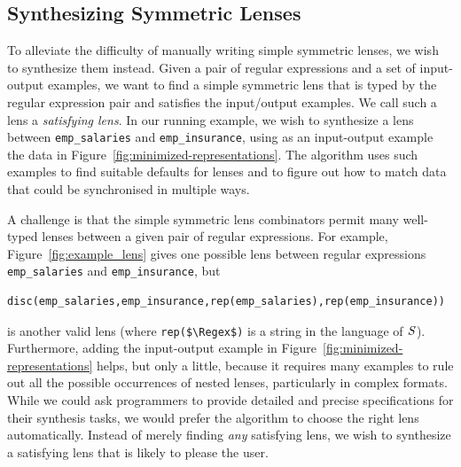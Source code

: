 \documentclass[acmsmall,screen,anonymous]{acmart}
\begin{document}
\subsection{Synthesizing Symmetric Lenses}

To alleviate the difficulty of manually writing simple symmetric
lenses, we wish to synthesize them instead. Given 
a pair of regular expressions and a set of input-output examples, we want to
find a simple symmetric lens that is typed by the regular expression
pair and satisfies the input/output examples. We call such a lens
a \emph{satisfying lens}.
In our running example, we wish to
synthesize a lens between \lstinline{emp_salaries} and \lstinline{emp_insurance},
using as an input-output example the data in
Figure~\ref{fig:minimized-representations}.  The algorithm uses such
examples to find suitable defaults for \Disconnect lenses and to
figure out how to match data that could be synchronised in multiple
ways. 

A challenge is that the simple symmetric lens combinators permit many
well-typed lenses
between a given pair of regular expressions. For example, 
Figure~\ref{fig:example_lens} gives one possible lens between regular
expressions  \lstinline{emp_salaries} and \lstinline{emp_insurance},
but 
%
\begin{lstlisting}
disc(emp_salaries,emp_insurance,rep(emp_salaries),rep(emp_insurance))
\end{lstlisting}
%
is another valid lens (where \lstinline{rep($\Regex$)} is a string in the
language of $\mathit{S}$). Furthermore, adding the input-output example in
Figure~\ref{fig:minimized-representations} 
helps, but only a little, because it requires many examples to rule
out all the possible occurrences of nested \Disconnect lenses,
particularly in complex formats. 
While
we could ask programmers to provide detailed and precise specifications for their
synthesis tasks, we would prefer the algorithm to choose the right lens
automatically. Instead of merely finding \emph{any} satisfying lens, we wish to
synthesize a satisfying lens that is likely to please the user.  
\end{document}

